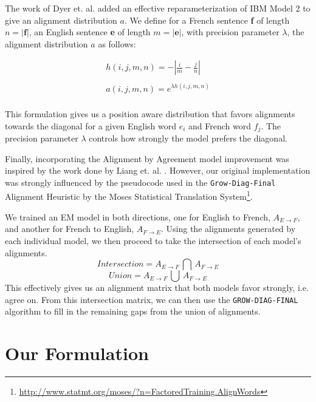 \documentclass[twoside,twocolumn]{article}
\begin{document}
The work of Dyer et. al. \cite{dyer2013simple} added an effective reparameterization of IBM Model 2 to give an alignment distribution $a$. We define for a French sentence \textbf{f} of length $n = |\textbf{f}|$, an English sentence \textbf{e} of length $m=|\textbf{e}|$, with precision parameter $\lambda$, the alignment distribution $a$ as follows:

\begin{equation}
\begin{split}
h(i,j,m,n) = - \left| \frac{i}{m} - \frac{j}{n}\right| \\
\\
a(i,j,m,n) =e^{  \lambda h(i,j,m,n)} \\
\end{split}
\end{equation}


This formulation gives us a position aware distribution that favors alignments towards the diagonal for a given English word $e_i$ and French word $f_j$. The precision parameter $\lambda$ controls how strongly the model prefers the diagonal.

Finally, incorporating the Alignment by Agreement model improvement was inspired by the work done by Liang et. al. \cite{liang2006alignment}. However, our original implementation was strongly influenced by the pseudocode used in the \texttt{Grow-Diag-Final} Alignment Heuristic by the Moses Statistical Translation System\footnote{\url{http://www.statmt.org/moses/?n=FactoredTraining.AlignWords}}. 

We trained an EM model in both directions, one for English to French, $A_{E \rightarrow F}$, and another for French to English, $A_{F \rightarrow E}$. Using the alignments generated by each individual model, we then proceed to take the intersection of each model's alignments. 
\begin{equation}
Intersection = A_{E \rightarrow F} \, \bigcap \, A_{F \rightarrow E}
\end{equation}
\begin{equation}
Union = A_{E \rightarrow F} \, \bigcup \, A_{F \rightarrow E}
\end{equation}
This effectively gives us an alignment matrix that both models favor strongly, i.e. agree on. From this intersection matrix, we can then use the \texttt{GROW-DIAG-FINAL} algorithm to fill in the remaining gaps from the union of alignments. 


\section{Our Formulation}
\end{document}
